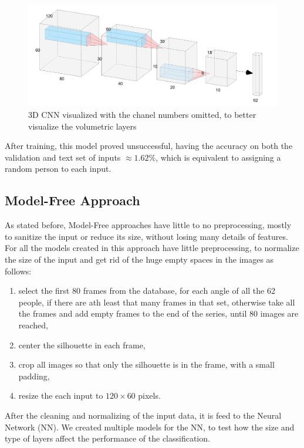 \documentclass[12pt]{article}
\theoremstyle{definition}
\begin{document}
	\begin{figure}
		\includegraphics[width=\textwidth]{3D-CNN.png}
		\caption{3D CNN visualized with the chanel numbers omitted, to better visualize the volumetric layers}
		\label{figure:3D-CNN}
	\end{figure}

	After training, this model proved unsuccessful, having the accuracy on both the validation and text set of inputs $\approx 1.62\%$, which is equivalent to assigning a random person to each input.

	\subsection{Model-Free Approach}

	As stated before, Model-Free approaches have little to no preprocessing, mostly to sanitize the input or reduce its size, without losing many details of features. For all the models created in this approach have little preprocessing, to normalize the size of the input and get rid of the huge empty spaces in the images as follows:
	\begin{enumerate}
		\item select the first 80 frames from the database, for each angle of all the 62 people, if there are ath least that many frames in that set, otherwise take all the frames and add empty frames to the end of the series, until 80 images are reached,
		\item center the silhouette in each frame,
		\item crop all images so that only the silhouette is in the frame, with a small padding,
		\item resize the each input to $120 \times 60$ pixels.
	\end{enumerate}

	After the cleaning and normalizing of the input data, it is feed to the Neural Network (NN). We created multiple models for the NN, to test how the size and type of layers affect the performance of the classification.
\end{document}
